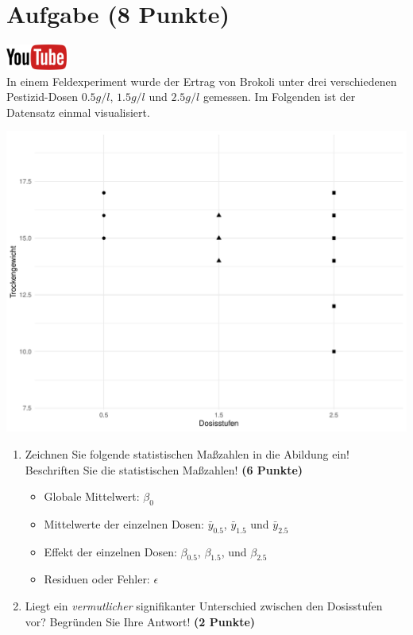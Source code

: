 \documentclass[a4paper, 9pt]{scrartcl}\usepackage[]{graphicx}\usepackage[]{xcolor}
\makeatletter
\def\maxwidth{ %
  \ifdim\Gin@nat@width>\linewidth
    \linewidth
  \else
    \Gin@nat@width
  \fi
}
\newenvironment{knitrout}{}{} %
\makeatother
\begin{document}
\section{Aufgabe \hfill (8 Punkte)}

\hfill\href{https://youtu.be/Q7xtQJoOmQI}{\includegraphics[width =
  2cm]{img/youtube}}\\[1Ex]



In einem Feldexperiment wurde der Ertrag von Brokoli unter drei verschiedenen
Pestizid-Dosen $0.5 g/l$, $1.5 g/l$ und $2.5 g/l$ gemessen. Im Folgenden ist der
Datensatz einmal visualisiert.

\begin{knitrout}
\color{fgcolor}

{\centering \includegraphics[width=\maxwidth]{img/anova-01-a-1} 

}


\end{knitrout}

\begin{enumerate}
\item Zeichnen Sie folgende statistischen Ma{\ss}zahlen in die Abildung ein!
  Beschriften Sie die statistischen Ma{\ss}zahlen! \textbf{(6 Punkte)}
  \begin{itemize}
  \item Globale Mittelwert: $\beta_0$
  \item Mittelwerte der einzelnen Dosen: $\bar{y}_{0.5}$, $\bar{y}_{1.5}$ und $\bar{y}_{2.5}$
  \item Effekt der einzelnen Dosen: $\beta_{0.5}$, $\beta_{1.5}$,
    und $\beta_{2.5}$
  \item Residuen oder Fehler: $\epsilon$
  \end{itemize}
\item Liegt ein \textit{vermutlicher} signifikanter Unterschied zwischen
  den Dosisstufen vor? Begr{\"u}nden Sie Ihre Antwort! \textbf{(2 Punkte)}
\end{enumerate}
 
\end{document}
